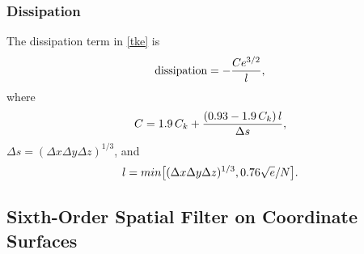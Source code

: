 \subsubsection{Dissipation}

The dissipation term in \eqref{tke} is
%
\begin{equation}
\hbox{dissipation} = - {Ce^{3/2} \over l},
\notag
\end{equation}
%
\noindent
where 
%
\begin{equation}
C = 1.9 \, C_k  + { (0.93 - 1.9 \, C_k)\, l \over \Delta s},
\notag
\end{equation}
%
\noindent
$\Delta s =  (\Delta x \Delta y \Delta z)^{1/3}$,  
and
%
\begin{equation}
l = min\bigl[(\Delta x \Delta y \Delta z)^{1/3}, 0.76 \sqrt{e}/N\bigr].
\notag
\end{equation}

\subsection{Sixth-Order Spatial Filter on Coordinate Surfaces}

